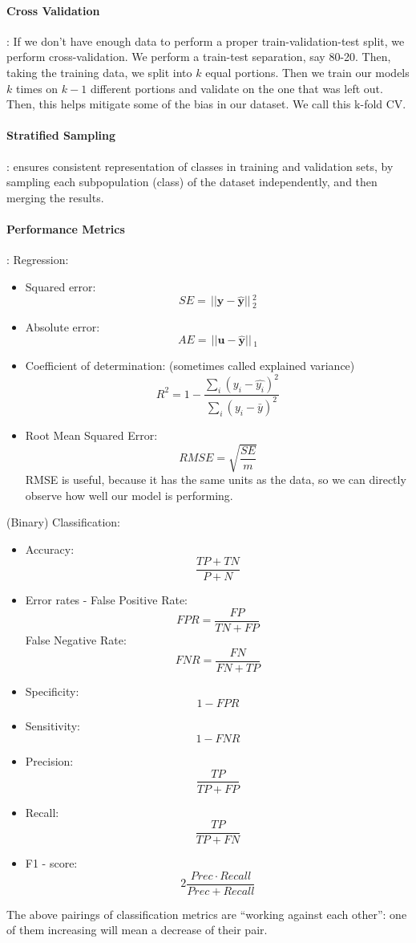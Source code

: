 \documentclass{article}
\renewcommand{\vec}[1]{\mathbf{#1}}
\newcommand{\norm}[1]{\,||#1||\,}
\begin{document}
\paragraph{Cross Validation}:
If we don't have enough data to perform a proper train-validation-test split, we
perform cross-validation. We perform a train-test separation, say 80-20.
Then, taking the training data, we split into $k$ equal portions. Then we train
our models $k$ times on $k - 1$ different portions and validate on the one that
was left out. Then, this helps mitigate some of the bias in our dataset. We call
this k-fold CV.
\paragraph{Stratified Sampling}: ensures consistent representation of classes in
training and validation sets, by sampling each subpopulation (class) of the
dataset independently, and then merging the results.
\paragraph{Performance Metrics}:
Regression:
\begin{itemize}
\item Squared error:
  \[
    SE = \norm{\vec{y} - \hat{\vec{y}}}^2_2
  \]
\item Absolute error:
  \[
    AE = \norm{\vec{u} - \hat{\vec{y}}}_1
  \]
\item Coefficient of determination: (sometimes called explained variance)
  \[
    R^2 = 1 - \frac{\sum_i (y_i - \hat{y_i})^2}{\sum_i (y_i - \bar{y})^2}
  \]
\item Root Mean Squared Error:
  \[
    RMSE = \sqrt{\frac{SE}{m}}
  \]
  RMSE is useful, because it has the same units as the data, so we can
  directly observe how well our model is performing.
\end{itemize}
(Binary) Classification:
\begin{itemize}
\item Accuracy:
  \[
    \frac{TP + TN}{P + N}
  \]
\item Error rates - False Positive Rate:
  \[
    FPR = \frac{FP}{TN + FP}
  \]
  False Negative Rate:
  \[
    FNR = \frac{FN}{FN + TP}
  \]
\item Specificity:
  \[
    1 - FPR
  \]
\item Sensitivity:
  \[
    1 - FNR
  \]
\item Precision:
  \[
    \frac{TP}{TP + FP}
  \]
\item Recall:
  \[
    \frac{TP}{TP + FN}
  \]
\item F1 - score:
  \[
    2\frac{Prec \cdot Recall}{Prec + Recall}
  \]
\end{itemize}
The above pairings of classification metrics are ``working against each other'':
one of them increasing will mean a decrease of their pair.
\end{document}

